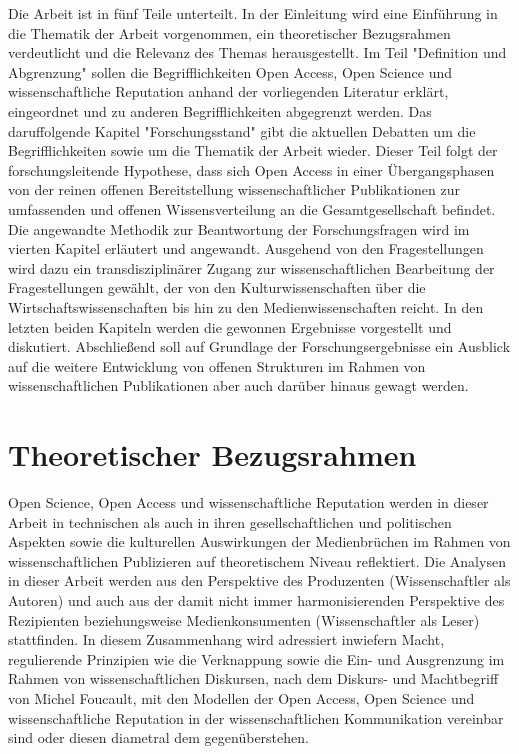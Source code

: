 Die Arbeit ist in fünf Teile unterteilt. In der Einleitung wird eine Einführung in die Thematik der Arbeit vorgenommen, ein theoretischer Bezugsrahmen verdeutlicht und die Relevanz des Themas herausgestellt. Im Teil "Definition und Abgrenzung" sollen die Begrifflichkeiten Open Access, Open Science und wissenschaftliche Reputation anhand der vorliegenden Literatur erklärt, eingeordnet und zu anderen Begrifflichkeiten abgegrenzt werden. Das daruffolgende Kapitel "Forschungsstand" gibt die aktuellen Debatten um die Begrifflichkeiten sowie um die Thematik der Arbeit wieder. Dieser Teil folgt der forschungsleitende Hypothese, dass sich Open Access in einer Übergangsphasen von der reinen offenen Bereitstellung wissenschaftlicher Publikationen zur umfassenden und offenen Wissensverteilung an die Gesamtgesellschaft befindet. Die angewandte Methodik zur Beantwortung der Forschungsfragen wird im vierten Kapitel erläutert und angewandt. Ausgehend von den Fragestellungen wird dazu ein transdisziplinärer Zugang zur wissenschaftlichen Bearbeitung der Fragestellungen gewählt, der von den Kulturwissenschaften über die Wirtschaftswissenschaften bis hin zu den Medienwissenschaften reicht. In den letzten beiden Kapiteln werden die gewonnen Ergebnisse vorgestellt und diskutiert. Abschließend soll auf Grundlage der Forschungsergebnisse ein Ausblick auf die weitere Entwicklung von offenen Strukturen im Rahmen von wissenschaftlichen Publikationen aber auch darüber hinaus gewagt werden.

\section{Theoretischer Bezugsrahmen} 

Open Science, Open Access und wissenschaftliche Reputation werden in dieser Arbeit in technischen als auch in ihren gesellschaftlichen und politischen Aspekten sowie die kulturellen Auswirkungen der Medienbrüchen im Rahmen von wissenschaftlichen Publizieren auf theoretischem Niveau reflektiert. Die Analysen in dieser Arbeit werden aus den Perspektive des Produzenten (Wissenschaftler als Autoren) und auch aus der damit nicht immer harmonisierenden Perspektive des Rezipienten beziehungsweise Medienkonsumenten (Wissenschaftler als Leser) stattfinden. In diesem Zusammenhang wird adressiert inwiefern Macht, regulierende Prinzipien wie die Verknappung sowie die Ein- und Ausgrenzung im Rahmen von wissenschaftlichen Diskursen, nach dem Diskurs- und Machtbegriff von Michel Foucault, mit den Modellen der Open Access, Open Science und wissenschaftliche Reputation in der wissenschaftlichen Kommunikation vereinbar sind oder diesen diametral dem gegenüberstehen. 

